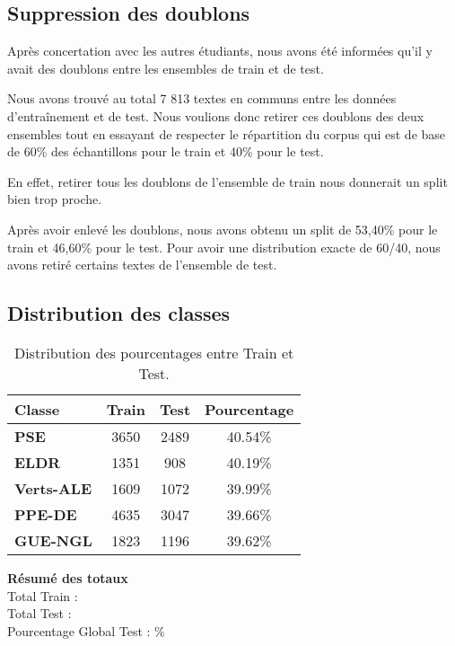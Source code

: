 \documentclass[11pt]{article}
\begin{document}
\subsection{Suppression des doublons}
Après concertation avec les autres étudiants, nous avons été informées qu'il y avait des doublons entre les ensembles de train et de test.

Nous avons trouvé au total 7 813 textes en communs entre les données d'entraînement et de test. Nous voulions donc retirer ces doublons des deux ensembles tout en essayant de respecter le répartition du corpus qui est de base de 60\% des échantillons pour le train et 40\% pour le test. 

En effet, retirer tous les doublons de l'ensemble de train nous donnerait un split bien trop proche.

Après avoir enlevé les doublons, nous avons obtenu un split de 53,40\% pour le train et 46,60\% pour le test. Pour avoir une distribution exacte de 60/40, nous avons retiré certains textes de l'ensemble de test.

\subsection{Distribution des classes}
\begin{table}[H]
    \centering
    \begin{tabular}{|l|c|c|c|}
        \hline
        \textbf{Classe}   & \textbf{Train} & \textbf{Test} & \textbf{Pourcentage} \\ \hline
        \textbf{PSE}      & 3650           & 2489          & 40.54\%              \\ \hline
        \textbf{ELDR}     & 1351           & 908           & 40.19\%              \\ \hline
        \textbf{Verts-ALE}& 1609           & 1072          & 39.99\%              \\ \hline
        \textbf{PPE-DE}   & 4635           & 3047          & 39.66\%              \\ \hline
        \textbf{GUE-NGL}  & 1823           & 1196          & 39.62\%              \\ \hline
    \end{tabular}
    \caption{Distribution des pourcentages entre Train et Test.}
    \label{tab:pourcentage_test}
\end{table}

\textbf{Résumé des totaux} \\
Total Train :  \\
Total Test  :  \\
Pourcentage Global Test : \%
\end{document}
